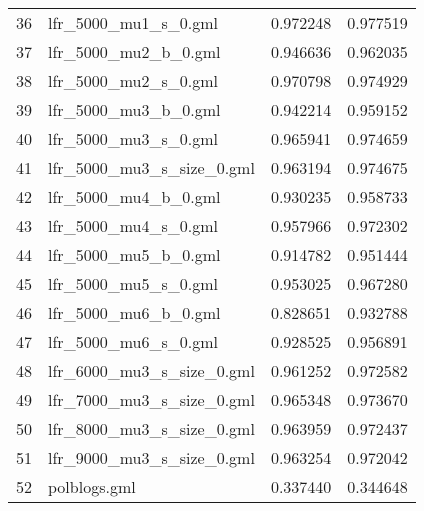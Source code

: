 \begin{tabular}{llrr}
36 &        lfr\_5000\_mu1\_s\_0.gml &                      0.972248 &                    0.977519 \\
37 &        lfr\_5000\_mu2\_b\_0.gml &                      0.946636 &                    0.962035 \\
38 &        lfr\_5000\_mu2\_s\_0.gml &                      0.970798 &                    0.974929 \\
39 &        lfr\_5000\_mu3\_b\_0.gml &                      0.942214 &                    0.959152 \\
40 &        lfr\_5000\_mu3\_s\_0.gml &                      0.965941 &                    0.974659 \\
41 &   lfr\_5000\_mu3\_s\_size\_0.gml &                      0.963194 &                    0.974675 \\
42 &        lfr\_5000\_mu4\_b\_0.gml &                      0.930235 &                    0.958733 \\
43 &        lfr\_5000\_mu4\_s\_0.gml &                      0.957966 &                    0.972302 \\
44 &        lfr\_5000\_mu5\_b\_0.gml &                      0.914782 &                    0.951444 \\
45 &        lfr\_5000\_mu5\_s\_0.gml &                      0.953025 &                    0.967280 \\
46 &        lfr\_5000\_mu6\_b\_0.gml &                      0.828651 &                    0.932788 \\
47 &        lfr\_5000\_mu6\_s\_0.gml &                      0.928525 &                    0.956891 \\
48 &   lfr\_6000\_mu3\_s\_size\_0.gml &                      0.961252 &                    0.972582 \\
49 &   lfr\_7000\_mu3\_s\_size\_0.gml &                      0.965348 &                    0.973670 \\
50 &   lfr\_8000\_mu3\_s\_size\_0.gml &                      0.963959 &                    0.972437 \\
51 &   lfr\_9000\_mu3\_s\_size\_0.gml &                      0.963254 &                    0.972042 \\
52 &                polblogs.gml &                      0.337440 &                    0.344648 \\
\bottomrule
\end{tabular}
